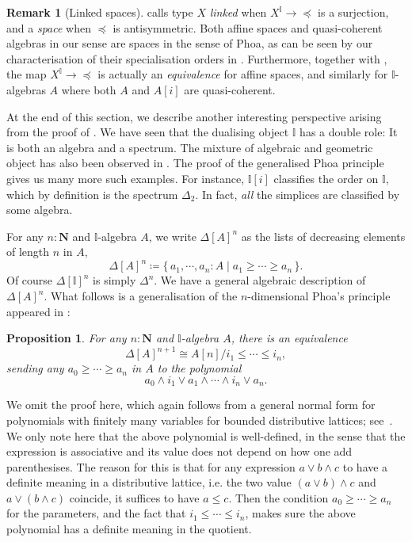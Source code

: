 \documentclass[a4paper,12pt]{amsart}
\newtheorem{proposition}[theorem]{Proposition}
\theoremstyle{definition}
\newtheorem{remark}[theorem]{Remark}
\newcommand{\mb}[1]{\mathbf{#1}}
\newcommand{\mbb}[1]{\mathbb{#1}}
\newcommand{\I}{\mbb I}
\newcommand{\scomp}[2]{\{\,#1\mid#2\,\}}
\newcommand{\N}{\mb N}
\begin{document}
\begin{remark}[Linked spaces]
  \citet{PhoaWesleyKym-Son1991DtiR} calls type $X$ \emph{linked} when $X^\I \to \operatorname{\preceq}$ is a surjection, and a \emph{space} when $\preceq$ is antisymmetric. Both affine spaces and quasi-coherent algebras in our sense are spaces in the sense of Phoa, as can be seen by our characterisation of their specialisation orders in . Furthermore, together with , the map $X^\I \to \operatorname{\preceq}$ is actually an \emph{equivalence} for affine spaces, and similarly for $\I$-algebras $A$ where both $A$ and $A[i]$ are quasi-coherent.
\end{remark}

At the end of this section, we describe another interesting perspective arising from the proof of . We have seen that the dualising object $\I$ has a double role: It is both an algebra and a spectrum. The mixture of algebraic and geometric object has also been observed in . The proof of the generalised Phoa principle gives us many more such examples. For instance, $\I[i]$ classifies the order on $\I$, which by definition is the spectrum $\Delta_2$. In fact, \emph{all} the simplices are classified by some algebra.

For any $n : \N$ and $\I$-algebra $A$, we write $\Delta[A]^{n}$ as the lists of decreasing elements of length $n$ in $A$,
\[ \Delta[A]^{n} \coloneq \scomp{a_1,\cdots,a_n : A}{a_1 \ge \cdots \ge a_n}. \]
Of course $\Delta[\I]^n$ is simply $\Delta^n$. We have a general algebraic description of $\Delta[A]^n$. What follows is a generalisation of the $n$-dimensional Phoa's principle appeared in \cite{pugh2025partialmapclassifiersierpinski}:

\begin{proposition}\label{prop:simplicesasalgebra}
  For any $n : \N$ and $\I$-algebra $A$, there is an equivalence 
  \[ \Delta[A]^{n+1} \cong A[n]/i_1 \le \cdots \le i_n, \]
  sending any $a_0 \ge \cdots \ge a_n$ in $A$ to the polynomial 
  \[ a_0 \wedge i_1 \vee a_1 \wedge \cdots \wedge i_n \vee a_n. \]
\end{proposition}

We omit the proof here, which again follows from a general normal form for polynomials with finitely many variables for bounded distributive lattices; see~\cite[Thm. 10.21]{lausch2000algebra}. We only note here that the above polynomial is well-defined, in the sense that the expression is associative and its value does not depend on how one add parenthesises. The reason for this is that for any expression $a \vee b \wedge c$ to have a definite meaning in a distributive lattice, i.e. the two value $(a \vee b) \wedge c$ and $a \vee (b \wedge c)$ coincide, it suffices to have $a \le c$. Then the condition $a_0 \ge \cdots \ge a_n$ for the parameters, and the fact that $i_1 \le \cdots \le i_n$, makes sure the above polynomial has a definite meaning in the quotient.
\end{document}
